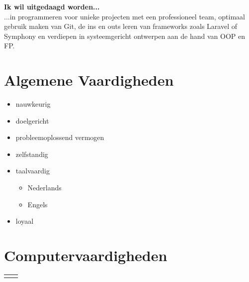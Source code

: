 \documentclass[
	11pt, %
]{FreemanCV}
\begin{document}
\begin{paracol}{2}
	\textbf{Ik wil uitgedaagd worden...}\\
	...in programmeren voor unieke projecten met een professioneel team, optimaal gebruik maken 
	van Git, de ins en outs leren van frameworks zoals Laravel of Symphony en verdiepen in 
	systeemgericht ontwerpen aan de hand van OOP en FP.


	\section{Algemene Vaardigheden}
	\begin{itemize}
		\item nauwkeurig
		\item doelgericht
		\item probleemoplossend vermogen
		\item zelfstandig
		\item taalvaardig
			\begin{itemize}
				\item \small Nederlands
				\item \small Engels \normalsize 
			\end{itemize}
		\item loyaal
	\end{itemize}

	\section{Computervaardigheden}

	\begin{supertabular}{r l} %


\end{supertabular}
\end{paracol}
\end{document}
